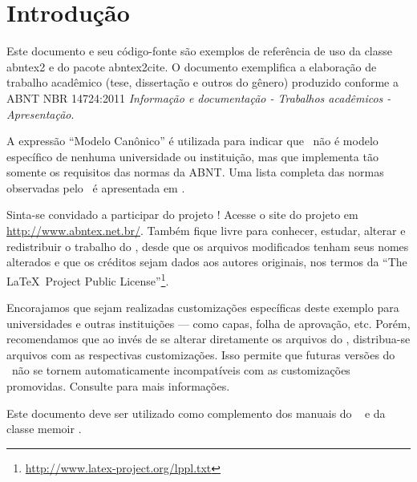 \documentclass[
	12pt,				%
	openright,			%
    oneside,
	a4paper,			%
	chapter=TITLE,
	english,			%
	brazil				%
	]{abntex2}
\begin{document}
\tableofcontents*
\cleardoublepage



\textual

\chapter{Introdução}

Este documento e seu código-fonte são exemplos de referência de uso da classe
\textsf{abntex2} e do pacote \textsf{abntex2cite}. O documento 
exemplifica a elaboração de trabalho acadêmico (tese, dissertação e outros do
gênero) produzido conforme a ABNT NBR 14724:2011 \emph{Informação e documentação
- Trabalhos acadêmicos - Apresentação}.

A expressão ``Modelo Canônico'' é utilizada para indicar que \abnTeX\ não é
modelo específico de nenhuma universidade ou instituição, mas que implementa tão
somente os requisitos das normas da ABNT. Uma lista completa das normas
observadas pelo \abnTeX\ é apresentada em .

Sinta-se convidado a participar do projeto \abnTeX! Acesse o site do projeto em
\url{http://www.abntex.net.br/}. Também fique livre para conhecer,
estudar, alterar e redistribuir o trabalho do \abnTeX, desde que os arquivos
modificados tenham seus nomes alterados e que os créditos sejam dados aos
autores originais, nos termos da ``The \LaTeX\ Project Public
License''\footnote{\url{http://www.latex-project.org/lppl.txt}}.

Encorajamos que sejam realizadas customizações específicas deste exemplo para
universidades e outras instituições --- como capas, folha de aprovação, etc.
Porém, recomendamos que ao invés de se alterar diretamente os arquivos do
\abnTeX, distribua-se arquivos com as respectivas customizações.
Isso permite que futuras versões do \abnTeX~não se tornem automaticamente
incompatíveis com as customizações promovidas. Consulte
 para mais informações.

Este documento deve ser utilizado como complemento dos manuais do \abnTeX\ 
\cite{abntex2classe,abntex2cite,abntex2cite-alf} e da classe \textsf{memoir}
\cite{memoir}. 
\end{document}
